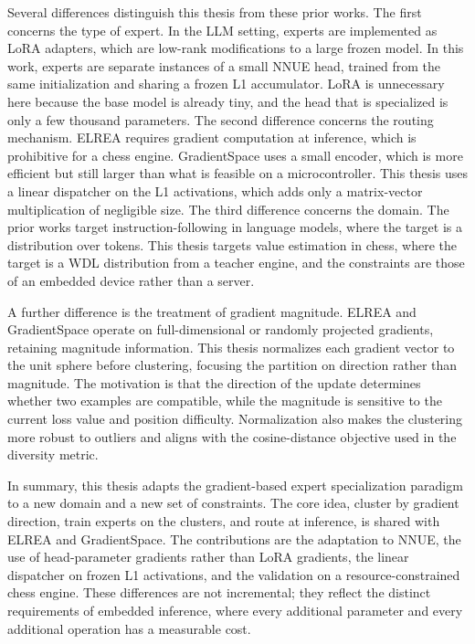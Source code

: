 Several differences distinguish this thesis from these prior works. The first concerns the type of expert. In the LLM setting, experts are implemented as LoRA adapters, which are low-rank modifications to a large frozen model. In this work, experts are separate instances of a small NNUE head, trained from the same initialization and sharing a frozen L1 accumulator. LoRA is unnecessary here because the base model is already tiny, and the head that is specialized is only a few thousand parameters. The second difference concerns the routing mechanism. ELREA requires gradient computation at inference, which is prohibitive for a chess engine. GradientSpace uses a small encoder, which is more efficient but still larger than what is feasible on a microcontroller. This thesis uses a linear dispatcher on the L1 activations, which adds only a matrix-vector multiplication of negligible size. The third difference concerns the domain. The prior works target instruction-following in language models, where the target is a distribution over tokens. This thesis targets value estimation in chess, where the target is a WDL distribution from a teacher engine, and the constraints are those of an embedded device rather than a server.

A further difference is the treatment of gradient magnitude. ELREA and GradientSpace operate on full-dimensional or randomly projected gradients, retaining magnitude information. This thesis normalizes each gradient vector to the unit sphere before clustering, focusing the partition on direction rather than magnitude. The motivation is that the direction of the update determines whether two examples are compatible, while the magnitude is sensitive to the current loss value and position difficulty. Normalization also makes the clustering more robust to outliers and aligns with the cosine-distance objective used in the diversity metric.

In summary, this thesis adapts the gradient-based expert specialization paradigm to a new domain and a new set of constraints. The core idea, cluster by gradient direction, train experts on the clusters, and route at inference, is shared with ELREA and GradientSpace. The contributions are the adaptation to NNUE, the use of head-parameter gradients rather than LoRA gradients, the linear dispatcher on frozen L1 activations, and the validation on a resource-constrained chess engine. These differences are not incremental; they reflect the distinct requirements of embedded inference, where every additional parameter and every additional operation has a measurable cost.
